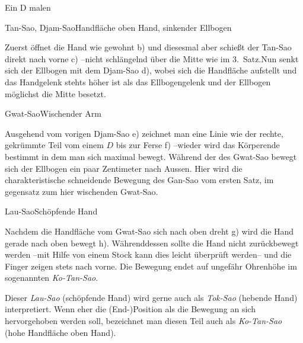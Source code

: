 
\begin{WTSatz}{Ein D malen}%

	
	\begin{WTSatzTeil}{Tan-Sao, Djam-Sao}{Handfl\"ache oben Hand, sinkender Ellbogen}
		
		Zuerst \"offnet die Hand wie gewohnt b) und diesesmal aber schie{\ss}t der Tan-Sao direkt nach vorne c) --nicht schl\"angelnd \"uber die Mitte wie im 3.~Satz.Nun senkt sich der Ellbogen mit dem Djam-Sao d), wobei sich die Handfl\"ache aufstellt und das Handgelenk stehts h\"oher ist als das Ellbogengelenk und der Ellbogen m\"oglichst die Mitte besetzt.
		
		
	\end{WTSatzTeil}
	\begin{WTSatzTeil}{Gwat-Sao}{Wischender Arm}
		
		Ausgehend vom vorigen Djam-Sao e) zeichnet man eine Linie wie der rechte, gekr\"ummte Teil vom einem $D$ bis zur Ferse f) --wieder wird das K\"orperende bestimmt in dem man sich maximal bewegt. W\"ahrend der  des Gwat-Sao bewegt sich der Ellbogen ein paar Zentimeter nach Aussen. Hier wird die charakteristische schneidende Bewegung des Gan-Sao vom ersten Satz, im gegensatz zum hier wischenden Gwat-Sao.
		
	\end{WTSatzTeil}
	\begin{WTSatzTeil}{Lau-Sao}{Sch\"opfende Hand}
		
		Nachdem die Handfl\"ache vom Gwat-Sao sich nach oben dreht g) wird die Hand gerade nach oben bewegt h). W\"ahrenddessen sollte die Hand nicht zur\"uckbewegt werden --mit Hilfe von einem Stock kann dies leicht \"uberpr\"uft werden-- und die Finger zeigen stets nach vorne. Die Bewegung endet auf ungef\"ahr Ohrenh\"ohe im sogenannten \textit{Ko-Tan-Sao}.
		
		
	\begin{WTCommonBegriff}
		Dieser \textit{Lau-Sao} (sch\"opfende Hand) wird gerne auch als \textit{Tok-Sao} (hebende Hand) interpretiert. Wenn eher die (End-)Position als die Bewegung an sich hervorgehoben werden soll, bezeichnet man diesen Teil auch als \textit{Ko-Tan-Sao} (hohe Handfl\"ache oben Hand).
	\end{WTCommonBegriff}
	

\end{WTSatzTeil}
\end{WTSatz}
